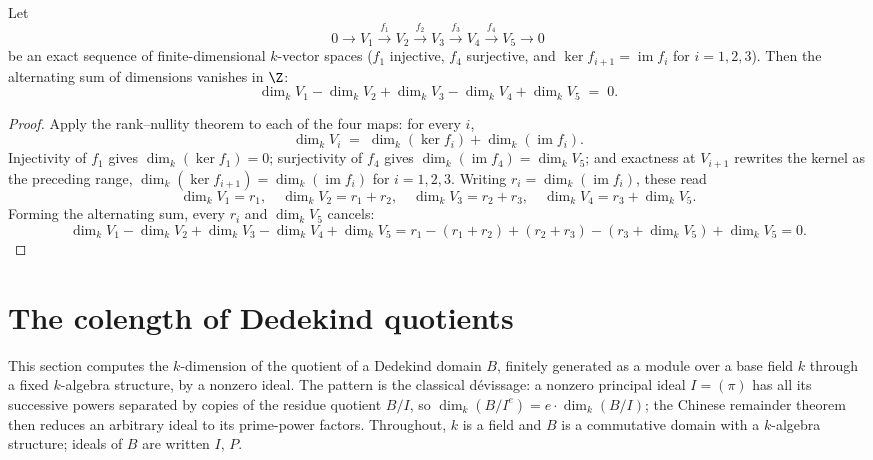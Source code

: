 \begin{theorem}
  \label{thm:finrank_alt_sum_exact5}
  \leanok
  Let
  \[
    0 \longrightarrow V_1 \xrightarrow{\ f_1\ } V_2 \xrightarrow{\ f_2\ } V_3
      \xrightarrow{\ f_3\ } V_4 \xrightarrow{\ f_4\ } V_5 \longrightarrow 0
  \]
  be an exact sequence of finite-dimensional \(k\)-vector spaces (\(f_1\) injective, \(f_4\)
  surjective, and \(\ker f_{i+1} = \operatorname{im} f_i\) for \(i = 1, 2, 3\)). Then the
  alternating sum of dimensions vanishes in \(\Z\):
  \[
    \dim_k V_1 - \dim_k V_2 + \dim_k V_3 - \dim_k V_4 + \dim_k V_5 \;=\; 0 .
  \]
\end{theorem}
\begin{proof}
  \leanok
  Apply the rank--nullity theorem to each of the four maps: for every \(i\),
  \[
    \dim_k V_i \;=\; \dim_k(\ker f_i) + \dim_k(\operatorname{im} f_i) .
  \]
  Injectivity of \(f_1\) gives \(\dim_k(\ker f_1) = 0\); surjectivity of \(f_4\) gives
  \(\dim_k(\operatorname{im} f_4) = \dim_k V_5\); and exactness at \(V_{i+1}\) rewrites the
  kernel as the preceding range, \(\dim_k(\ker f_{i+1}) = \dim_k(\operatorname{im} f_i)\) for
  \(i = 1, 2, 3\). Writing \(r_i = \dim_k(\operatorname{im} f_i)\), these read
  \[
    \dim_k V_1 = r_1,\quad
    \dim_k V_2 = r_1 + r_2,\quad
    \dim_k V_3 = r_2 + r_3,\quad
    \dim_k V_4 = r_3 + \dim_k V_5 .
  \]
  Forming the alternating sum, every \(r_i\) and \(\dim_k V_5\) cancels:
  \[
    \dim_k V_1 - \dim_k V_2 + \dim_k V_3 - \dim_k V_4 + \dim_k V_5
      = r_1 - (r_1 + r_2) + (r_2 + r_3) - (r_3 + \dim_k V_5) + \dim_k V_5 = 0 .
  \]
\end{proof}

\section{The colength of Dedekind quotients}
\label{sec:dedekind_colength}

This section computes the \(k\)-dimension of the quotient of a Dedekind domain \(B\), finitely
generated as a module over a base field \(k\) through a fixed \(k\)-algebra structure, by a
nonzero ideal. The pattern is the classical dévissage: a nonzero principal ideal
\(I = (\pi)\) has all its successive powers separated by copies of the residue quotient
\(B/I\), so \(\dim_k(B/I^e) = e \cdot \dim_k(B/I)\); the Chinese remainder theorem then reduces
an arbitrary ideal to its prime-power factors. Throughout, \(k\) is a field and \(B\) is a
commutative domain with a \(k\)-algebra structure; ideals of \(B\) are written \(I\), \(P\).

